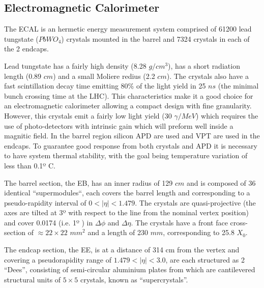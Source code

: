 \subsection{Electromagnetic Calorimeter}
\label{SUBSECTION:ExperimentalApparatus_CMS_ECAL}


The \gls{ECAL} is an hermetic energy measurement system comprised of 61200 lead tungstate ($PbWO_4$) crystals mounted in the barrel and 7324 crystals in each of the 2 endcaps.

Lead tungstate has a fairly high density (8.28 $g/cm^3$), has a short radiation length (0.89 $cm$) and a small Moliere redius (2.2 $cm$). The crystals also have a fast scintillation decay time emitting 80\% of the light yield in 25 $ns$ (the minimal bunch crossing time at the LHC). This characteristics make it a good choice for an electromagnetic calorimeter allowing a compact design with fine granularity. However, this crystals emit a fairly low light yield (30 $\gamma/MeV$) which requires the use of photo-detectors with intrinsic gain which will preform well inside a magnitic field. In the barrel region silicon \gls{APD} are used and \gls{VPT} are used in the endcaps. To guarantee good response from both crystals and \gls{APD} it is necessary to have system thermal stability, with the goal being temperature variation of less than 0.1º C.

The barrel section, the \gls{EB}, has an inner radius of 129 $cm$ and is composed of 36 identical ``supermodules``, each covers the barrel length and corresponding to a pseudo-rapidity interval of $0<|\eta|<1.479$. The crystals are quasi-projective (the axes are tilted at 3º with respect to the line from the nominal vertex position) and cover 0.0174 (i.e. 1º ) in $\Delta\phi$ and $\Delta\eta$. The crystals have a front face cross-section of $\approx 22\times22$ $mm^2$ and a length of 230 $mm$, corresponding to 25.8 $X_0$.

The endcap section, the \gls{EE}, is at a distance of 314 cm from the vertex and covering a pseudorapidity range of $1.479<|\eta|<3.0$, are each structured as 2 “Dees”, consisting of semi-circular aluminium plates from which are cantilevered structural units of $5\times5$ crystals, known as “supercrystals”.

